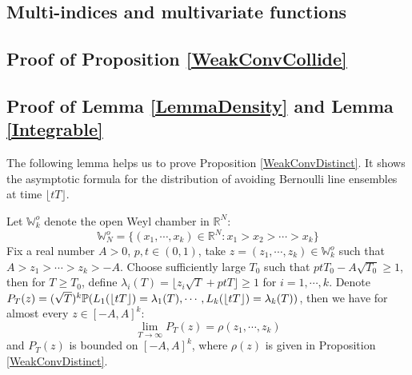 \subsection{Multi-indices and multivariate functions}\label{multivar}

\subsection{Proof of Proposition \ref{WeakConvCollide}}{\label{ProofProp2}}
\subsection{Proof of Lemma \ref{LemmaDensity} and Lemma \ref{Integrable}}{\label{Pf2Lemma}}
The following lemma helps us to prove Proposition \ref{WeakConvDistinct}. It shows the asymptotic formula for the distribution of avoiding Bernoulli line ensembles at time $\lfloor tT \rfloor$. 
\begin{lemma}{\label{PointConvLemma}}
	Let $\mathbb{W}_{k}^{o}$ denote the open Weyl chamber in $\mathbb{R}^{N}$:
$$\mathbb{W}_{N}^{o}=\{(x_{1},\cdots,x_{k})\in\mathbb{R}^{N}:x_{1}>x_{2}>\cdots>x_{k}\}$$ Fix a real number $A>0$, $p,t\in(0,1)$, take $z=(z_{1},\cdots,z_{k})\in\mathbb{W}_{k}^{o}$ such that $A>z_{1}>\cdots>z_{k}>-A$. Choose sufficiently large $T_{0}$ such that $ptT_{0}-A\sqrt{T_{0}}\geqslant 1$, then for $T\geqslant T_{0}$, define $\lambda_{i}(T)=\lfloor z_{i}\sqrt{T}+ptT\rfloor\geqslant 1$ for $i=1,\cdots,k$. Denote $P_{T}(z)=(\sqrt{T})^{k}\mathbb{P}(L_1(\lfloor tT\rfloor)=\lambda_1(T),\cdots, L_k(\lfloor tT\rfloor)=\lambda_k(T))$, then we have for almost every $z\in[-A,A]^{k}$:
$$\lim_{T\rightarrow\infty}P_{T}(z)=\rho(z_{1},\cdots,z_{k})$$ and $P_{T}(z)$ is bounded on $[-A,A]^{k}$, where $\rho(z)$ is given in Proposition \ref{WeakConvDistinct}.
\end{lemma}

